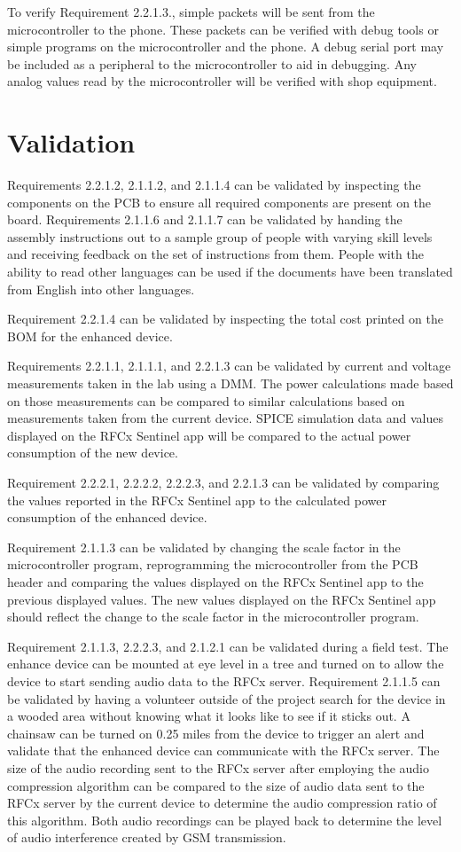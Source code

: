 \documentclass{article}
\begin{document}
{To verify Requirement 2.2.1.3., simple packets will be sent from the microcontroller to the phone. These packets can be verified with debug tools or simple programs on the microcontroller and the phone. A debug serial port may be included as a peripheral to the microcontroller to aid in debugging. Any analog values read by the microcontroller will be verified with shop equipment.

\section{Validation}
Requirements 2.2.1.2, 2.1.1.2, and 2.1.1.4 can be validated by inspecting the components on the PCB to ensure all required components are present on the board. Requirements 2.1.1.6 and 2.1.1.7 can be validated by handing the assembly instructions out to a sample group of people with varying skill levels and receiving feedback on the set of instructions from them. People with the ability to read other languages can be used if the documents have been translated from English into other languages.

Requirement 2.2.1.4 can be validated by inspecting the total cost printed on the BOM for the enhanced device.

Requirements 2.2.1.1, 2.1.1.1, and 2.2.1.3 can be validated by current and voltage measurements taken in the lab using a DMM. The power calculations made based on those measurements can be compared to similar calculations based on measurements taken from the current device. SPICE simulation data and values displayed on the RFCx Sentinel app will be compared to the actual power consumption of the new device.

Requirement 2.2.2.1, 2.2.2.2, 2.2.2.3, and 2.2.1.3 can be validated by comparing the values reported in the RFCx Sentinel app to the calculated power consumption of the enhanced device.

Requirement 2.1.1.3 can be validated by changing the scale factor in the microcontroller program, reprogramming the microcontroller from the PCB header and comparing the values displayed on the RFCx Sentinel app to the previous displayed values. The new values displayed on the RFCx Sentinel app should reflect the change to the scale factor in the microcontroller program.

Requirement 2.1.1.3, 2.2.2.3, and 2.1.2.1 can be validated during a field test. The enhance device can be mounted at eye level in a tree and turned on to allow the device to start sending audio data to the RFCx server. Requirement 2.1.1.5 can be validated by having a volunteer outside of the project search for the device in a wooded area without knowing what it looks like to see if it sticks out. A chainsaw can be turned on 0.25 miles from the device to trigger an alert and validate that the enhanced device can communicate with the RFCx server. The size of the audio recording sent to the RFCx server after employing the audio compression algorithm can be compared to the size of audio data sent to the RFCx server by the current device to determine the audio compression ratio of this algorithm. Both audio recordings can be played back to determine the level of audio interference created by GSM transmission.

}
\end{document}
